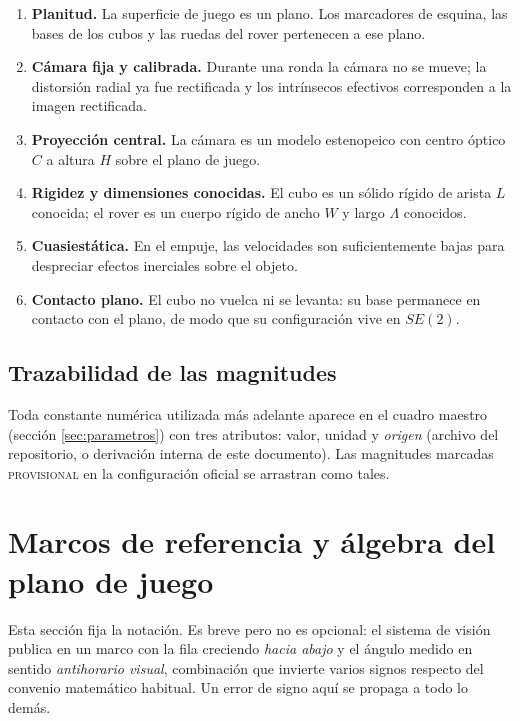 \documentclass[11pt,a4paper]{article}
\theoremstyle{definition}
\begin{document}
\begin{enumerate}[label=H\arabic*.,leftmargin=2.6em,itemsep=3pt]
\item \textbf{Planitud.} La superficie de juego es un plano. Los marcadores de esquina,
      las bases de los cubos y las ruedas del rover pertenecen a ese plano.
\item \textbf{Cámara fija y calibrada.} Durante una ronda la cámara no se mueve; la
      distorsión radial ya fue rectificada y los intrínsecos efectivos corresponden a
      la imagen rectificada.
\item \textbf{Proyección central.} La cámara es un modelo estenopeico con centro
      óptico $C$ a altura $H$ sobre el plano de juego.
\item \textbf{Rigidez y dimensiones conocidas.} El cubo es un sólido rígido de arista
      $L$ conocida; el rover es un cuerpo rígido de ancho $W$ y largo $\Lambda$
      conocidos.
\item \textbf{Cuasiestática.} En el empuje, las velocidades son suficientemente bajas
      para despreciar efectos inerciales sobre el objeto.
\item \textbf{Contacto plano.} El cubo no vuelca ni se levanta: su base permanece en
      contacto con el plano, de modo que su configuración vive en $SE(2)$.
\end{enumerate}

\subsection{Trazabilidad de las magnitudes}

Toda constante numérica utilizada más adelante aparece en el cuadro maestro
(sección \ref{sec:parametros}) con tres atributos: valor, unidad y \emph{origen}
(archivo del repositorio, o derivación interna de este documento). Las magnitudes
marcadas \textsc{provisional} en la configuración oficial se arrastran como tales.

\section{Marcos de referencia y álgebra del plano de juego}
\label{sec:marcos}

Esta sección fija la notación. Es breve pero no es opcional: el sistema de visión
publica en un marco con la fila creciendo \emph{hacia abajo} y el ángulo medido en
sentido \emph{antihorario visual}, combinación que invierte varios signos respecto
del convenio matemático habitual. Un error de signo aquí se propaga a todo lo demás.
\end{document}
